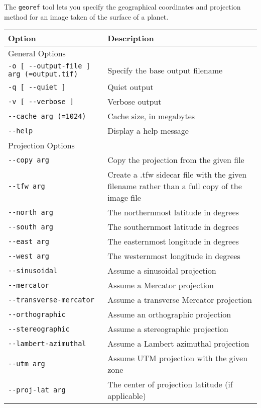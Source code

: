 The \verb#georef# tool lets you specify the geographical coordinates and projection method for an image taken of the surface of a planet.

\begin{table}
\begin{tabular}{|l|l|} \hline
Option & Description \\ \hline \hline
General Options \\ \hline
\verb#-o [ --output-file ] arg (=output.tif)# & Specify the base output filename \\ \hline
\verb#-q [ --quiet ]# & Quiet output \\ \hline
\verb#-v [ --verbose ]# & Verbose output \\ \hline
\verb#--cache arg (=1024)# & Cache size, in megabytes \\ \hline
\verb#--help# & Display a help message \\ \hline
Projection Options \\ \hline
\verb#--copy arg# & Copy the projection from the given file \\ \hline
\verb#--tfw arg# & Create a .tfw sidecar file with the given filename rather than a full copy of the image file \\ \hline
\verb#--north arg# & The northernmost latitude in degrees \\ \hline
\verb#--south arg# & The southernmost latitude in degrees \\ \hline
\verb#--east arg# & The easternmost longitude in degrees \\ \hline
\verb#--west arg# & The westernmost longitude in degrees \\ \hline
\verb#--sinusoidal# & Assume a sinusoidal projection \\ \hline
\verb#--mercator# & Assume a Mercator projection \\ \hline
\verb#--transverse-mercator# & Assume a transverse Mercator projection \\ \hline
\verb#--orthographic# & Assume an orthographic projection \\ \hline
\verb#--stereographic# & Assume a stereographic projection \\ \hline
\verb#--lambert-azimuthal# & Assume a Lambert azimuthal projection \\ \hline
\verb#--utm arg# & Assume UTM projection with the given zone \\ \hline
\verb#--proj-lat arg# & The center of projection latitude (if applicable) \\ \hline

\end{tabular}
\end{table}
